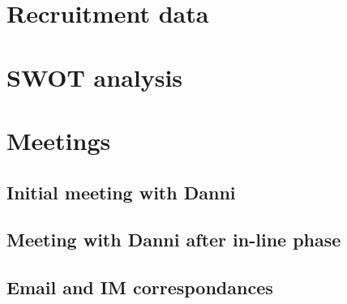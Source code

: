 \chapter{Recruitment data}

\chapter{SWOT analysis}

\chapter{Meetings}
\section{Initial meeting with Danni}

\section{Meeting with Danni after in-line phase}

\section{Email and IM correspondances}

